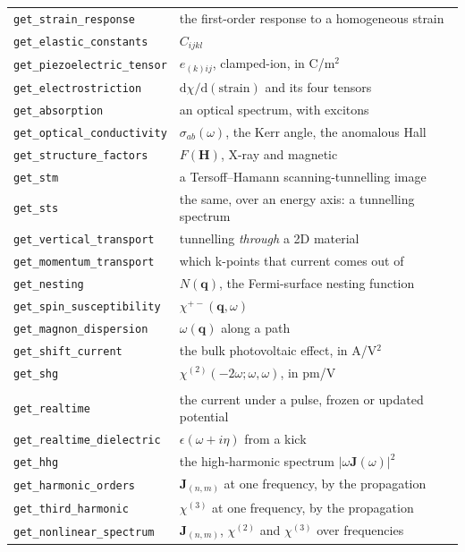 \documentclass[11pt,a4paper]{article}
\newcommand{\code}[1]{\texttt{\small #1}}
\begin{document}
\begin{center}
\begin{longtable}{@{}ll@{}}
\code{get\_strain\_response} & the first-order response to a homogeneous strain \\
\code{get\_elastic\_constants} & $C_{ijkl}$ \\
\code{get\_piezoelectric\_tensor} & $e_{(k)ij}$, clamped-ion, in C/m$^2$ \\
\code{get\_electrostriction} & $\mathrm{d}\chi/\mathrm{d}(\text{strain})$ and its four tensors \\
\code{get\_absorption} & an optical spectrum, with excitons \\
\code{get\_optical\_conductivity} & $\sigma_{ab}(\omega)$, the Kerr angle, the anomalous Hall \\
\code{get\_structure\_factors} & $F(\mathbf H)$, X-ray and magnetic \\
\code{get\_stm} & a Tersoff--Hamann scanning-tunnelling image \\
\code{get\_sts} & the same, over an energy axis: a tunnelling spectrum \\
\code{get\_vertical\_transport} & tunnelling \emph{through} a 2D material \\
\code{get\_momentum\_transport} & which k-points that current comes out of \\
\code{get\_nesting} & $N(\mathbf q)$, the Fermi-surface nesting function \\
\code{get\_spin\_susceptibility} & $\chi^{+-}(\mathbf q,\omega)$ \\
\code{get\_magnon\_dispersion} & $\omega(\mathbf q)$ along a path \\
\code{get\_shift\_current} & the bulk photovoltaic effect, in A/V$^2$ \\
\code{get\_shg} & $\chi^{(2)}(-2\omega;\omega,\omega)$, in pm/V \\
\addlinespace
\multicolumn{2}{@{}l}{\textit{Real-time propagation and the nonlinear orders}} \\
\midrule
\code{get\_realtime} & the current under a pulse, frozen or updated potential \\
\code{get\_realtime\_dielectric} & $\epsilon(\omega+i\eta)$ from a kick \\
\code{get\_hhg} & the high-harmonic spectrum $|\omega\mathbf J(\omega)|^2$ \\
\code{get\_harmonic\_orders} & $\mathbf J_{(n,m)}$ at one frequency, by the propagation \\
\code{get\_third\_harmonic} & $\chi^{(3)}$ at one frequency, by the propagation \\
\code{get\_nonlinear\_spectrum} & $\mathbf J_{(n,m)}$, $\chi^{(2)}$ and $\chi^{(3)}$ over frequencies \\

\end{longtable}
\end{center}
\end{document}
